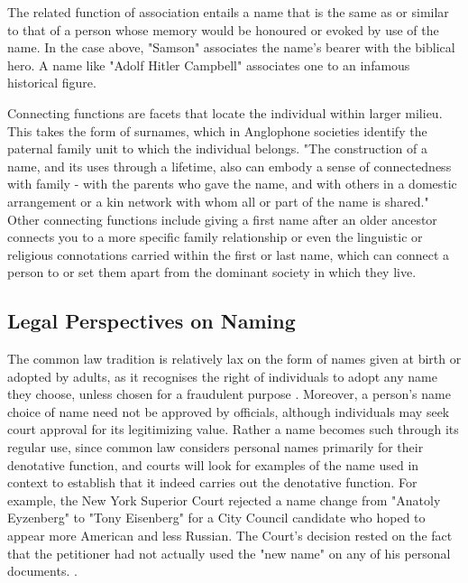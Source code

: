 The related function of association entails a name that is the same as or
similar to that of a person whose memory would be honoured or evoked by use of
the name. In the case above, "Samson" associates the name's bearer with the
biblical hero. A name like "Adolf Hitler Campbell" associates one to an
infamous historical figure. 

Connecting functions are facets that locate the individual within larger
milieu.  This takes the form of surnames, which in Anglophone societies
identify the paternal family unit to which the individual belongs. "The
construction of a name, and its uses through a lifetime, also can embody a
sense of connectedness with family - with the parents who gave the name, and
with others in a domestic arrangement or a kin network with whom all or part of
the name is shared." \parencite[711]{finch08} Other connecting functions
include giving a first name after an older ancestor connects you to a more
specific family relationship or even the linguistic or religious connotations
carried within the first or last name, which can connect a person to or set
them apart from the dominant society in which they live.

\subsection{Legal Perspectives on Naming}

The common law tradition is relatively lax on the form of names given at birth
or adopted by adults, as it recognises the right of individuals to adopt any
name they choose, unless chosen for a fraudulent purpose
\parencite[403]{heymann11}. Moreover, a person's name choice of name need not
be approved by officials, although individuals may seek court approval for its
legitimizing value. Rather a name becomes such through its regular use, since
common law considers personal names primarily for their denotative function,
and courts will look for examples of the name used in context to establish that
it indeed carries out the denotative function. For example, the New York
Superior Court rejected a name change from "Anatoly Eyzenberg" to "Tony
Eisenberg" for a City Council candidate who hoped to appear more American and
less Russian. The Court's decision rested on the fact that the petitioner had
not actually used the "new name" on any of his personal documents.
\parencite{eisenberg03} \parencite[404]{heymann11}.

